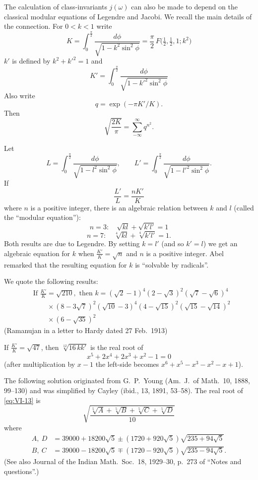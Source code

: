 The calculation of class-invariants $j(\omega)$ can also be made to
depend on the classical modular equations of Legendre and Jacobi. We
recall the main details of the connection. For $0<k<1$ write
\[
K=\int_{0}^{\frac{\pi}{2}}\frac{d\phi}{\sqrt{1-k^{2}\sin^{2}\phi}}
=\frac{\pi}{2}\,F\bigl(\tfrac{1}{2},\tfrac{1}{2},1;k^{2}\bigr)
\tag{8}\label{eq:VI-8}
\]
$k'$ is defined by $k^{2}+k'^{2}=1$ and
\[
K'=\int_{0}^{\frac{\pi}{2}}\frac{d\phi}{\sqrt{1-k'^{2}\sin^{2}\phi}}
\tag{9}\label{eq:VI-9}
\]
Also write
\[
q=\exp(-\pi K'/K).
\]
Then
\[
\sqrt{\frac{2K}{\pi}}=\sum_{-\infty}^{\infty}q^{n^{2}}.
\tag{10}\label{eq:VI-10}
\]

Let
\[
L=\int_{0}^{\frac{\pi}{2}}\frac{d\phi}{\sqrt{1-l^{2}\sin^{2}\phi}},\qquad
L'=\int_{0}^{\frac{\pi}{2}}\frac{d\phi}{\sqrt{1-l'^{2}\sin^{2}\phi}}.
\]
If
\[
\frac{L'}{L}=\frac{nK'}{K}
\]
where $n$ is a positive integer, there is an algebraic relation between
$k$ and $l$ (called the ``modular equation''):
\[
n=3:\quad\sqrt{kl}+\sqrt{k'l'}=1
\]
\[
n=7:\quad\sqrt[4]{kl}+\sqrt[4]{k'l'}=1.
\]
Both results are due to Legendre. By setting $k=l'$ (and so $k'=l$) we get
an algebraic equation for $k$ when $\frac{K'}{K}=\sqrt{n}$ and $n$ is a
positive integer. Abel remarked that the resulting equation for $k$ is
``solvable by radicals''.

We quote the following results:
\[
\begin{aligned}
&\text{If }\frac{K'}{K}=\sqrt{210},\text{ then }
k=(\sqrt{2}-1)^{4}(2-\sqrt{3})^{2}(\sqrt{7}-\sqrt{6})^{4}\\
&\qquad\times(8-3\sqrt{7})^{2}(\sqrt{10}-3)^{4}(4-\sqrt{15})^{2}
(\sqrt{15}-\sqrt{14})^{2}\\
&\qquad\times(6-\sqrt{35})^{2}
\end{aligned}
\tag{11}\label{eq:VI-11}
\]
(Ramanujan in a letter to Hardy dated 27 Feb.\ 1913)

\noindent
If $\frac{K'}{K}=\sqrt{47}$, then $\sqrt[12]{16\,kk'}$ is the real root of
\[
x^{5}+2x^{4}+2x^{3}+x^{2}-1=0
\tag{13}\label{eq:VI-13}
\]
(after multiplication by $x-1$ the left-side becomes
$x^{6}+x^{5}-x^{3}-x^{2}-x+1$).

The following solution originated from G.~P.~Young (Am.\ J.\ of Math.\
10, 1888, 99--130) and was simplified by Cayley (ibid., 13, 1891,
53--58). The real root of \eqref{eq:VI-13} is
\[
\sqrt{\frac{\sqrt[5]{A}+\sqrt[5]{B}+\sqrt[5]{C}+\sqrt[5]{D}}{10}}
\]
where
\[
\begin{aligned}
A,\ D&=39000+18200\sqrt{5}\pm(1720+920\sqrt{5})\sqrt{235+94\sqrt{5}}\\
B,\ C&=39000-18200\sqrt{5}\mp(1720-920\sqrt{5})\sqrt{235-94\sqrt{5}}.
\end{aligned}
\]
(See also Journal of the Indian Math.\ Soc.\ 18, 1929--30, p.~273 of
``Notes and questions''.)

